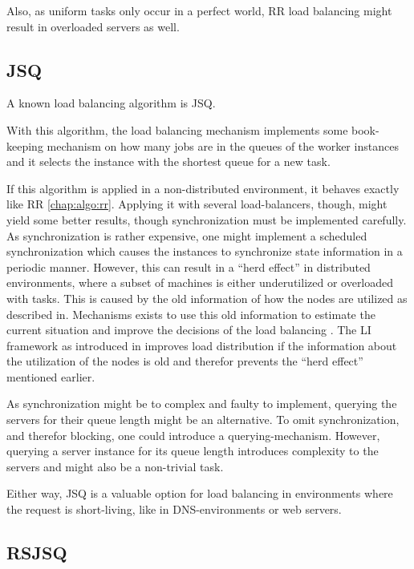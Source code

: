 Also, as uniform tasks only occur in a perfect world, \ac{RR} load balancing
might result in overloaded servers as well.

\subsection{\ac{JSQ}}

A known load balancing algorithm is \ac{JSQ}.

With this algorithm, the load balancing mechanism implements some book-keeping
mechanism on how many jobs are in the queues of the worker instances and it
selects the instance with the shortest queue for a new task.

If this algorithm is applied in a non-distributed environment, it behaves
exactly like \ac{RR} \ref{chap:algo:rr}.
Applying it with several load-balancers, though, might yield some better
results, though synchronization must be implemented carefully.
As synchronization is rather expensive, one might implement a scheduled
synchronization which causes the instances to synchronize state information in a
periodic manner.
However, this can result in a ``herd effect'' in distributed environments,
where a subset of machines is either underutilized or overloaded with tasks.
This is caused by the old information of how the nodes are
utilized as described in.
Mechanisms exists to use this old information to estimate the current situation
and improve the decisions of the load balancing \cite{inpSLoadInfo}.
The LI framework as introduced in \cite{inpSLoadInfo} improves load distribution
if the information about the utilization of the nodes is old and therefor
prevents the ``herd effect'' mentioned earlier.

As synchronization might be to complex and faulty to implement, querying the
servers for their queue length might be an alternative.
To omit synchronization, and therefor blocking, one could introduce a
querying-mechanism.
However, querying a server instance for its queue length introduces complexity
to the servers and might also be a non-trivial task.

Either way, \ac{JSQ} is a valuable option for load balancing in environments
where the request is short-living, like in \ac{DNS}-environments or web servers.

\subsection{\ac{RSJSQ}}

